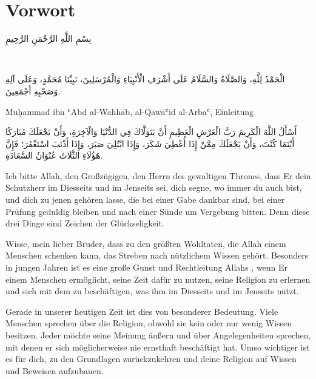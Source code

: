 \clearpage
\thispagestyle{plain}
\section*{Vorwort}

\begin{center}
{\arabicfont\begin{Arabic}بِسْمِ اللَّهِ الرَّحْمَنِ الرَّحِيمِ\end{Arabic}}\\[3mm]
{\arabicfont\begin{Arabic}الْحَمْدُ لِلَّهِ، وَالصَّلَاةُ وَالسَّلَامُ عَلَى أَشْرَفِ الْأَنْبِيَاءِ وَالْمُرْسَلِينَ، نَبِيِّنَا مُحَمَّدٍ، وَعَلَى آلِهِ وَصَحْبِهِ أَجْمَعِينَ.\end{Arabic}}
\end{center}

\begin{quranvers}{Muḥammad ibn ʿAbd al-Wahhāb, al-Qawāʿid al-Arbaʿ, Einleitung}
{\arabicfont\begin{Arabic}أَسْأَلُ اللَّهَ الْكَرِيمَ رَبَّ الْعَرْشِ الْعَظِيمِ أَنْ يَتَوَلَّاكَ فِي الدُّنْيَا وَالْآخِرَةِ، وَأَنْ يَجْعَلَكَ مُبَارَكًا أَيْنَمَا كُنْتَ، وَأَنْ يَجْعَلَكَ مِمَّنْ إِذَا أُعْطِيَ شَكَرَ، وَإِذَا ابْتُلِيَ صَبَرَ، وَإِذَا أَذْنَبَ اسْتَغْفَرَ؛ فَإِنَّ هَؤُلَاءِ الثَّلَاثَ عُنْوَانُ السَّعَادَةِ.\end{Arabic}}
\end{quranvers}

Ich bitte Allah, den Großzügigen, den Herrn des gewaltigen Thrones, dass Er dein Schutzherr im
Diesseits und im Jenseits sei, dich segne, wo immer du auch bist, und dich zu jenen gehören
lasse, die bei einer Gabe dankbar sind, bei einer Prüfung geduldig bleiben und nach einer Sünde
um Vergebung bitten. Denn diese drei Dinge sind Zeichen der Glückseligkeit.

Wisse, mein lieber Bruder, dass zu den größten Wohltaten, die Allah  einem Menschen
schenken kann, das Streben nach nützlichem Wissen gehört. Besonders in jungen Jahren ist es
eine große Gunst und Rechtleitung Allahs , wenn Er einem Menschen ermöglicht, seine Zeit
dafür zu nutzen, seine Religion zu erlernen und sich mit dem zu beschäftigen, was ihm im
Diesseits und im Jenseits nützt.

Gerade in unserer heutigen Zeit ist dies von besonderer Bedeutung. Viele Menschen sprechen
über die Religion, obwohl sie kein oder nur wenig Wissen besitzen. Jeder möchte seine Meinung
äußern und über Angelegenheiten sprechen, mit denen er sich möglicherweise nie ernsthaft
beschäftigt hat. Umso wichtiger ist es für dich, zu den Grundlagen zurückzukehren und deine
Religion auf Wissen und Beweisen aufzubauen.


